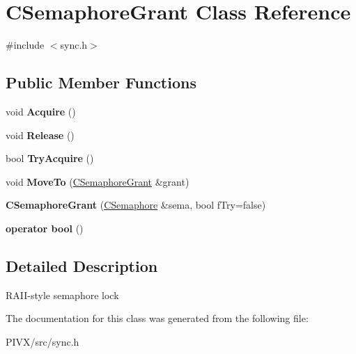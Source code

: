 \hypertarget{class_c_semaphore_grant}{}\section{C\+Semaphore\+Grant Class Reference}
\label{class_c_semaphore_grant}


{\ttfamily \#include $<$sync.\+h$>$}

\subsection*{Public Member Functions}
\begin{DoxyCompactItemize}
\item 
\mbox{\label{class_c_semaphore_grant_ac52976968379ea8e2470cfba877c3e89}} 
void {\bfseries Acquire} ()
\item 
\mbox{\label{class_c_semaphore_grant_a8d985eeace74e037baeb39bd2d586576}} 
void {\bfseries Release} ()
\item 
\mbox{\label{class_c_semaphore_grant_a9952d9ea087ced803c099f69992ebb1d}} 
bool {\bfseries Try\+Acquire} ()
\item 
\mbox{\label{class_c_semaphore_grant_ab3e6f84f304703abc52517b0c8de26cf}} 
void {\bfseries Move\+To} (\mbox{\hyperlink{class_c_semaphore_grant}{C\+Semaphore\+Grant}} \&grant)
\item 
\mbox{\label{class_c_semaphore_grant_a5998c457c7c223a8257166161d12b355}} 
{\bfseries C\+Semaphore\+Grant} (\mbox{\hyperlink{class_c_semaphore}{C\+Semaphore}} \&sema, bool f\+Try=false)
\item 
\mbox{\label{class_c_semaphore_grant_a91458b860e45949d87d770252e590a9b}} 
{\bfseries operator bool} ()
\end{DoxyCompactItemize}


\subsection{Detailed Description}
R\+A\+I\+I-\/style semaphore lock 

The documentation for this class was generated from the following file\+:\begin{DoxyCompactItemize}
\item 
P\+I\+V\+X/src/sync.\+h\end{DoxyCompactItemize}
